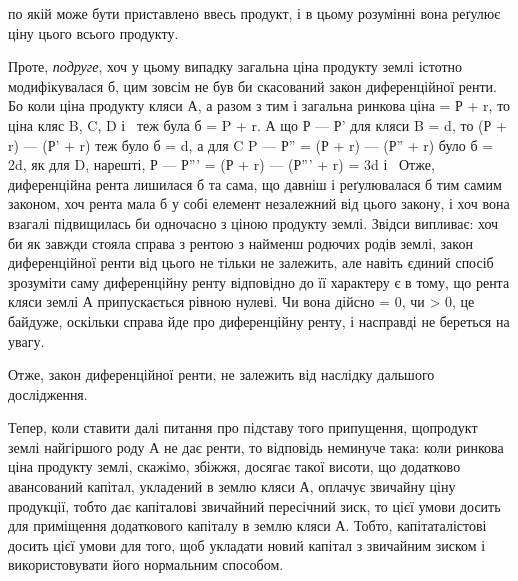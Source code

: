 \parcont{}  %
по якій може бути приставлено ввесь продукт, і в цьому розумінні вона реґулює
ціну цього всього продукту.

Проте, \emph{подруге}, хоч у цьому випадку загальна ціна продукту землі
істотно модифікувалася б, цим зовсім не був би скасований закон диференційної
ренти. Бо коли ціна продукту кляси А, а разом з тим і загальна ринкова
ціна = Р + r, то ціна кляс B, C, D і~ теж була б = P + r. А що
Р — Р' для кляси B = d, то (Р + r) — (Р' + r) теж було б = d, а для C P —
Р'' = (Р + r) — (Р'' + r) було б = 2d, як для D, нарешті, Р — Р''' = (Р +
r) — (Р''' + r) = 3d і~ Отже, диференційна рента лишилася б та сама, що
давніш і реґулювалася б тим самим законом, хоч рента мала б у собі елемент незалежний
від цього закону, і хоч вона взагалі підвищилась би одночасно з ціною продукту
землі. Звідси випливає: хоч би як завжди стояла справа з рентою з найменш
родючих родів землі, закон диференційної ренти від цього не тільки не залежить,
але навіть єдиний спосіб зрозуміти саму диференційну ренту відповідно до її
характеру є в тому, що рента кляси землі А припускається рівною нулеві. Чи
вона дійсно = 0, чи > 0, це байдуже, оскільки справа йде про диференційну
ренту, і насправді не береться на увагу.

Отже, закон диференційної ренти, не залежить від наслідку дальшого
дослідження.

Тепер, коли ставити далі питання про підставу того припущення, щопродукт
землі найгіршого роду А не дає ренти, то відповідь неминуче така:
коли ринкова ціна продукту землі, скажімо, збіжжя, досягає такої висоти, що
додатково авансований капітал, укладений в землю кляси А, оплачує звичайну
ціну продукції, тобто дає капіталові звичайний пересічний зиск, то цієї умови
досить для приміщення додаткового капіталу в землю кляси А. Тобто, капітаталістові
досить цієї умови для того, щоб укладати новий капітал з звичайним
зиском і використовувати його нормальним способом.

